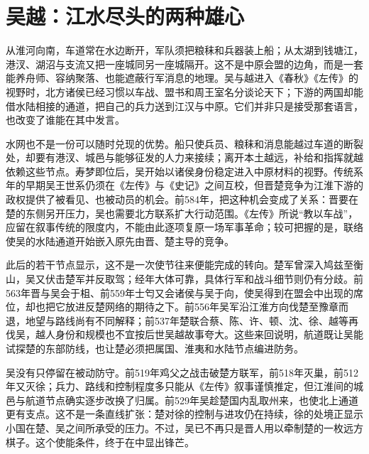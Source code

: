 \section{吴越：江水尽头的两种雄心}

从淮河向南，车道常在水边断开，军队须把粮秣和兵器装上船；从太湖到钱塘江，港汊、湖沼与支流又把一座城同另一座城隔开。这不是中原会盟的边角，而是一套能养舟师、容纳聚落、也能遮蔽行军消息的地理。吴与越进入《春秋》《左传》的视野时，北方诸侯已经习惯以车战、盟书和周王室名分谈论天下；下游的两国却能借水陆相接的通道，把自己的兵力送到江汉与中原。它们并非只是接受那套语言，也改变了谁能在其中发言。

水网也不是一份可以随时兑现的优势。船只使兵员、粮秣和消息能越过车道的断裂处，却要有港汊、城邑与能够征发的人力来接续；离开本土越远，补给和指挥就越依赖这些节点。寿梦即位后，吴开始以诸侯身份稳定进入中原材料的视野。传统系年的早期吴王世系仍须在《左传》与《史记》之间互校，但晋楚竞争为江淮下游的政权提供了被看见、也被动员的机会。前584年，把这种机会变成了关系：晋要在楚的东侧另开压力，吴也需要北方联系扩大行动范围。《左传》所说“教以车战”，应留在叙事传统的限度内，不能由此逐项复原一场军事革命；较可把握的是，联络使吴的水陆通道开始嵌入原先由晋、楚主导的竞争。

此后的若干节点显示，这不是一次使节往来便能完成的转向。楚军曾深入鸠兹至衡山，吴又伏击楚军并反取驾；经年大体可靠，具体行军和战斗细节则仍有分歧。前563年晋与吴会于柤、前559年士匄又会诸侯与吴于向，使吴得到在盟会中出现的席位，却也把它放进反楚网络的期待之下。前556年吴军沿江淮方向伐楚至豫章而退，地望与路线尚有不同解释；前537年楚联合蔡、陈、许、顿、沈、徐、越等再伐吴，越人身份和规模也不宜按后世吴越故事夸大。这些来回说明，航道既让吴能试探楚的东部防线，也让楚必须把属国、淮夷和水陆节点编进防务。

吴没有只停留在被动防守。前519年鸡父之战击破楚方联军，前518年灭巢，前512年又灭徐；兵力、路线和控制程度多只能从《左传》叙事谨慎推定，但江淮间的城邑与航道节点确实逐步改换了归属。前529年吴趁楚国内乱取州来，也使北上通道更有支点。这不是一条直线扩张：楚对徐的控制与进攻仍在持续，徐的处境正显示小国在楚、吴之间所承受的压力。不过，吴已不再只是晋人用以牵制楚的一枚远方棋子。这个使能条件，终于在中显出锋芒。

